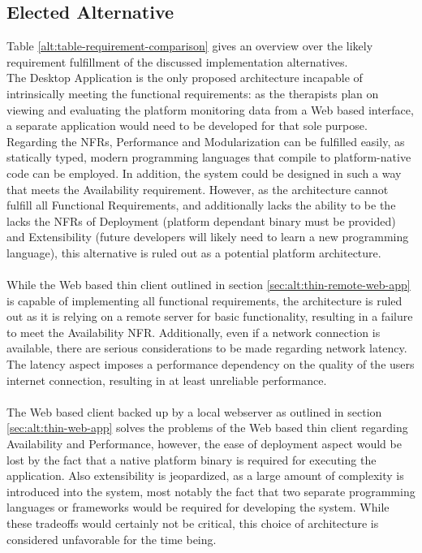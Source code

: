 \subsection{Elected Alternative}
Table \ref{alt:table-requirement-comparison} gives an overview over the likely requirement fulfillment of the discussed implementation alternatives. 
\\
The Desktop Application is the only proposed architecture incapable of intrinsically meeting the functional requirements: as the therapists plan on viewing and evaluating the platform monitoring data from a Web based interface, a separate application would need to be developed for that sole purpose. Regarding the \glspl{NFR}, Performance and Modularization can be fulfilled easily, as statically typed, modern programming languages that compile to platform-native code can be employed. In addition, the system could be designed in such a way that meets the Availability requirement. However, as the architecture cannot fulfill all Functional Requirements, and additionally lacks the ability to be the lacks the \glspl{NFR} of Deployment (platform dependant binary must be provided) and Extensibility (future developers will likely need to learn a new programming language), this alternative is ruled out as a potential platform architecture.
\\\\
While the Web based thin client outlined in section \ref{sec:alt:thin-remote-web-app} is capable of implementing all functional requirements, the architecture is ruled out as it is relying on a remote server for basic functionality, resulting in a failure to meet the Availability \gls{NFR}. Additionally, even if a network connection is available, there are serious considerations to be made regarding network latency. The latency aspect imposes a performance dependency on the quality of the users internet connection, resulting in at least unreliable performance.
\\\\
The Web based client backed up by a local webserver as outlined in section \ref{sec:alt:thin-web-app} solves the problems of the Web based thin client regarding Availability and Performance, however, the ease of deployment aspect would be lost by the fact that a native platform binary is required for executing the application. Also extensibility is jeopardized, as a large amount of complexity is introduced into the system, most notably the fact that two separate programming languages or frameworks would be required for developing the system. While these tradeoffs would certainly not be critical, this choice of architecture is considered unfavorable for the time being.
